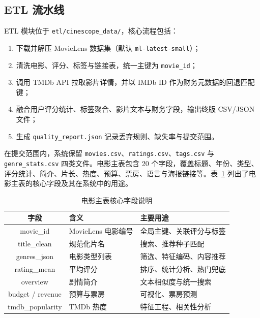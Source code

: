 \subsection{ETL 流水线}

ETL 模块位于 \texttt{etl/cinescope\_data/}，核心流程包括：

\begin{enumerate}
    \item 下载并解压 MovieLens 数据集（默认 \texttt{ml-latest-small}）；
    \item 清洗电影、评分、标签与链接表，统一主键为 \texttt{movie\_id}；
    \item 调用 TMDb API 拉取影片详情，并以 IMDb ID 作为财务元数据的回退匹配键；
    \item 融合用户评分统计、标签聚合、影片文本与财务字段，输出终版 CSV/JSON 文件；
    \item 生成 \texttt{quality\_report.json} 记录丢弃规则、缺失率与提交范围。
\end{enumerate}

在提交范围内，系统保留 \texttt{movies.csv}、\texttt{ratings.csv}、\texttt{tags.csv} 与 \texttt{genre\_stats.csv} 四类文件。电影主表包含 20 个字段，覆盖标题、年份、类型、评分统计、简介、片长、热度、预算、票房、语言与海报链接等。表~\ref{tab:movie-fields} 列出了电影主表的核心字段及其在系统中的用途。

\begin{table}[htbp]
    \centering
    \caption{电影主表核心字段说明} \label{tab:movie-fields}
    \begin{tabularx}{\textwidth}{|c|X|X|}
        \hline
        \textbf{字段} & \textbf{含义} & \textbf{主要用途} \\
        \hline
        movie\_id & MovieLens 电影编号 & 全局主键、关联评分与标签 \\
        \hline
        title\_clean & 规范化片名 & 搜索、推荐种子匹配 \\
        \hline
        genres\_json & 电影类型列表 & 筛选、特征编码、内容推荐 \\
        \hline
        rating\_mean & 平均评分 & 排序、统计分析、热门兜底 \\
        \hline
        overview & 剧情简介 & 文本相似度与统一搜索 \\
        \hline
        budget / revenue & 预算与票房 & 可视化、票房预测 \\
        \hline
        tmdb\_popularity & TMDb 热度 & 特征工程、相关性分析 \\
        \hline
    \end{tabularx}
\end{table}

